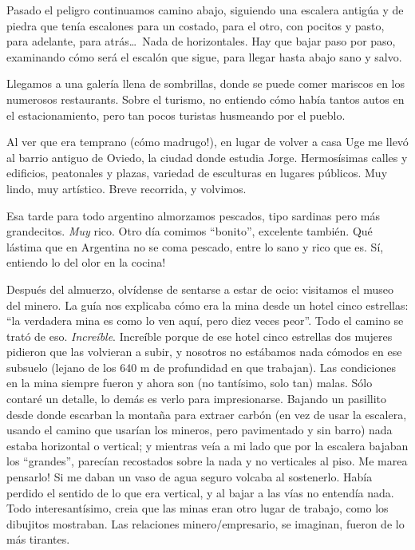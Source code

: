 Pasado el peligro continuamos camino abajo, siguiendo una escalera antig\'ua y
de piedra que ten\'ia escalones para un costado, para el otro, con pocitos y
pasto, para adelante, para atr\'as\ldots\ Nada de horizontales. Hay que bajar
paso por paso, examinando c\'omo ser\'a el escal\'on que sigue, para llegar
hasta abajo sano y salvo.

Llegamos a una galer\'ia llena de sombrillas, donde se puede comer mariscos en
los numerosos restaurants. Sobre el turismo, no entiendo c\'omo hab\'ia tantos
autos en el estacionamiento, pero tan pocos turistas husmeando por el pueblo.

Al ver que era temprano (\textexclamdown c\'omo madrugo!), en lugar de volver
a casa Uge me llev\'o al barrio antiguo de Oviedo, la ciudad donde estudia
Jorge. Hermos\'isimas calles y edificios, peatonales y plazas, variedad de
esculturas en lugares p\'ublicos. Muy lindo, muy art\'istico. Breve recorrida, y
volvimos.

Esa tarde para todo argentino almorzamos pescados, tipo sardinas pero m\'as
grandecitos. \emph{Muy} rico. Otro d\'ia comimos ``bonito'', excelente
tambi\'en. Qu\'e l\'astima que en Argentina no se coma pescado, entre lo sano
y rico que es. \textexclamdown S\'i, entiendo lo del olor en la cocina!

Despu\'es del almuerzo, olv\'idense de sentarse a estar de ocio: visitamos
el museo del minero. La gu\'ia nos explicaba c\'omo era la mina desde un hotel
cinco estrellas: ``la verdadera mina es como lo ven aqu\'i, pero diez veces
peor''. Todo el camino se trat\'o de eso. \emph{Incre\'ible}. Incre\'ible
porque de ese hotel cinco estrellas dos mujeres pidieron que las volvieran a
subir, y nosotros no est\'abamos nada c\'omodos en ese subsuelo (lejano de los
640 m de profundidad en que trabajan). Las condiciones en la mina siempre
fueron y ahora son (no tant\'isimo, solo tan) malas. S\'olo contar\'e un
detalle, lo dem\'as es verlo para impresionarse. Bajando un pasillito desde
donde escarban la monta\~na para extraer carb\'on (en vez de usar la escalera,
usando el camino que usar\'ian los mineros, pero pavimentado y sin barro) nada
estaba horizontal o vertical; y mientras ve\'ia a mi lado que por la escalera
bajaban los ``grandes'', parec\'ian recostados sobre la nada y no verticales
al piso. \textexclamdown Me marea pensarlo! Si me daban un vaso de agua seguro
volcaba al sostenerlo. Hab\'ia perdido el sentido de lo que era vertical, y al
bajar a las v\'ias no entend\'ia nada. Todo interesant\'isimo, creia que las
minas eran otro lugar de trabajo, como los dibujitos mostraban. Las relaciones
minero/empresario, se imaginan, fueron de lo m\'as tirantes.

